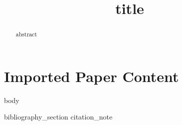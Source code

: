 \documentclass[11pt]{article}
\title{{{title}}}
\begin{document}
\maketitle

\begin{abstract}
{{abstract}}
\end{abstract}

\section*{Imported Paper Content}
{{body}}

{{bibliography_section}}
{{citation_note}}
\end{document}
